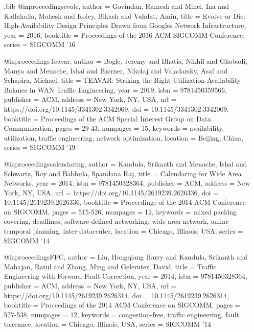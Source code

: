 \documentclass[sigconf]{acmart}
\begin{document}
\begin{filecontents}{\jobname.bib}
@inproceedings{evole,
 author = {Govindan, Ramesh and Minei, Ina and Kallahalla, Mahesh and Koley, Bikash and Vahdat, Amin}, 
 title = {Evolve or Die: High-Availability Design Principles Drawn from Googles Network Infrastructure}, 
 year = {2016},  
 booktitle = {Proceedings of the 2016 ACM SIGCOMM Conference}, 
 series = {SIGCOMM '16} }

@inproceedings{Teavar,
 author = {Bogle, Jeremy and Bhatia, Nikhil and Ghobadi, Manya and Menache, Ishai and Bj\o{}rner, Nikolaj and Valadarsky, Asaf and Schapira, Michael}, title = {TEAVAR: Striking the Right Utilization-Availability Balance in WAN Traffic Engineering}, year = {2019}, isbn = {9781450359566}, publisher = {ACM}, address = {New York, NY, USA}, url = {https://doi.org/10.1145/3341302.3342069}, doi = {10.1145/3341302.3342069}, booktitle = {Proceedings of the ACM Special Interest Group on Data Communication}, pages = {29-43}, numpages = {15}, keywords = {availability, utilization, traffic engineering, network optimization}, location = {Beijing, China}, series = {SIGCOMM '19} }


 
 
@inproceedings{calendaring, author = {Kandula, Srikanth and Menache, Ishai and Schwartz, Roy and Babbula, Spandana Raj}, title = {Calendaring for Wide Area Networks}, year = {2014}, isbn = {9781450328364}, publisher = {ACM}, address = {New York, NY, USA}, url = {https://doi.org/10.1145/2619239.2626336}, doi = {10.1145/2619239.2626336}, booktitle = {Proceedings of the 2014 ACM Conference on SIGCOMM}, pages = {515-526}, numpages = {12}, keywords = {mixed packing covering, deadlines, software-defined networking, wide area network, online temporal planning, inter-datacenter}, location = {Chicago, Illinois, USA}, series = {SIGCOMM '14} }

@inproceedings{FFC, author = {Liu, Hongqiang Harry and Kandula, Srikanth and Mahajan, Ratul and Zhang, Ming and Gelernter, David}, title = {Traffic Engineering with Forward Fault Correction}, year = {2014}, isbn = {9781450328364}, publisher = {ACM}, address = {New York, NY, USA}, url = {https://doi.org/10.1145/2619239.2626314}, doi = {10.1145/2619239.2626314}, booktitle = {Proceedings of the 2014 ACM Conference on SIGCOMM}, pages = {527-538}, numpages = {12}, keywords = {congestion-free, traffic engineering, fault tolerance}, location = {Chicago, Illinois, USA}, series = {SIGCOMM '14} }


\end{filecontents}
\end{document}
